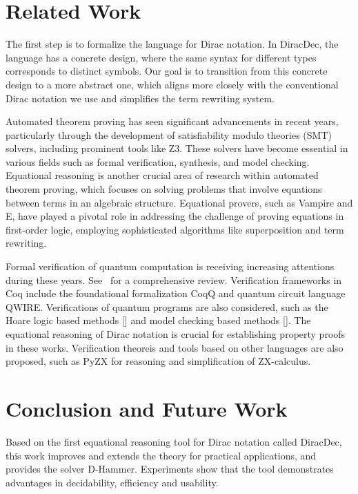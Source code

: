 
\section{Related Work}


The first step is to formalize the language for Dirac notation. In DiracDec, the language has a concrete design, where the same syntax for different types corresponds to distinct symbols. Our goal is to transition from this concrete design to a more abstract one, which aligns more closely with the conventional Dirac notation we use and simplifies the term rewriting system.

Automated theorem proving has seen significant advancements in recent years, particularly through the development of satisfiability modulo theories (SMT) solvers,
including prominent tools like Z3. These solvers have become essential in various fields such as formal verification, synthesis, and model checking. 
Equational reasoning is another crucial area of research within automated theorem proving, which focuses on solving problems that involve equations between terms in an algebraic structure. 
Equational provers, such as Vampire and E, have played a pivotal role in addressing the challenge of proving equations in first-order logic, employing sophisticated algorithms like superposition and term rewriting.

Formal verification of quantum computation is receiving increasing attentions during these years. See~\cite{Lewis2023} for a comprehensive review. 
Verification frameworks in Coq include the foundational formalization CoqQ and quantum circuit language QWIRE. 
Verifications of quantum programs are also considered, such as the Hoare logic based methods [] and model checking based methods [].
The equational reasoning of Dirac notation is crucial for establishing property proofs in these works.
Verification theoreis and tools based on other languages are also proposed, such as PyZX for reasoning and simplification of ZX-calculus.




\section{Conclusion and Future Work}
Based on the first equational reasoning tool for Dirac notation called DiracDec, this work improves and extends the theory for practical applications, and provides the solver D-Hammer. Experiments show that the tool demonstrates advantages in decidability, efficiency and usability. 

